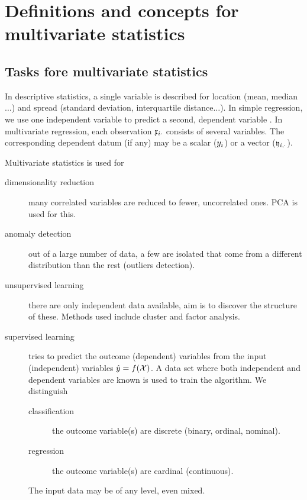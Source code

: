 \chapter{Definitions and concepts for multivariate statistics}\label{text:missing}
\begin{refsection}


\section{Tasks fore multivariate statistics}

In descriptive statistics, a single variable is described for location (mean, median$\ldots$) and spread (standard deviation, interquartile distance$\ldots$). In simple regression, we use one independent variable  to predict a second, dependent variable . In multivariate regression, each observation \( \mathfrak{x}_{i\cdot} \) consists of several variables. The corresponding dependent datum (if any) may be a scalar (\( y_i \)) or a vector (\( \mathfrak{y}_{i,\cdot} \)).

Multivariate statistics is used for
\begin{description}
  \item[dimensionality reduction]{many correlated variables are reduced to fewer, uncorrelated ones. \acs{PCA} is used for this. }
  \item[anomaly detection]{out of a large number of data, a few are isolated that come from a different distribution than the rest (outliers detection).}
  \item[unsupervised learning]{there are only independent data available, aim is to discover the structure of these. Methods used include cluster and factor analysis.}
  \item[supervised learning]{tries to predict the outcome (dependent) variables from the input (independent) variables \( \hat{y} = f(\mathcal{X}) \). A data set where both independent and dependent variables are known is used to train the algorithm. We distinguish
      \begin{description}
        \item[classification]{the outcome variable(s) are discrete (binary, ordinal, nominal).}
        \item[regression]{the outcome variable(s) are cardinal (continuous). }
      \end{description}
      The input data may be of any level, even mixed.}
\end{description}


\end{refsection}
